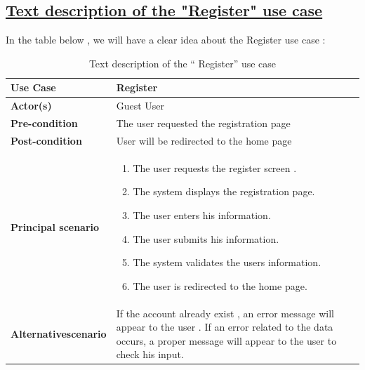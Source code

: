 \subsection*{\textbf{\underline{Text description of the "Register" use case}}}
In the table below , we will have a clear idea about the  Register use case : 
\begin{table}[H]
    \renewcommand{\arraystretch}{1.5}  
   \begin{tabular}{|p{}|p{}|}
   \hline
        \textbf{Use Case} &  Register  \\   \hline
        
        \textbf{Actor(s) } & Guest User  \\   \hline
        \textbf{Pre-condition} &     
             The user requested the registration page
\\   \hline
        \textbf{Post-condition} & User will be redirected to the home page  \\  \hline

                \textbf{Principal scenario} & 
                \begin{enumerate}[left=0pt]
                \item The user requests the register screen .
                \item The system displays the registration page.
                \item The user enters his information.
                \item The user submits his information.
                \item The system validates the users information.
                \item The user is redirected to the home page.
                \end{enumerate}  \\   \hline
                 
          \textbf{Alternative\newline scenario} & 
      
             
             If the account  already exist , an error  message will appear to the user .\newline
            If an error related to the data occurs, a proper message will appear to the user to check his input.
 \\   \hline
\end{tabular}
  
         \caption{Text description of the “ Register” use case}
    \label{tab:my_label}
\end{table}

